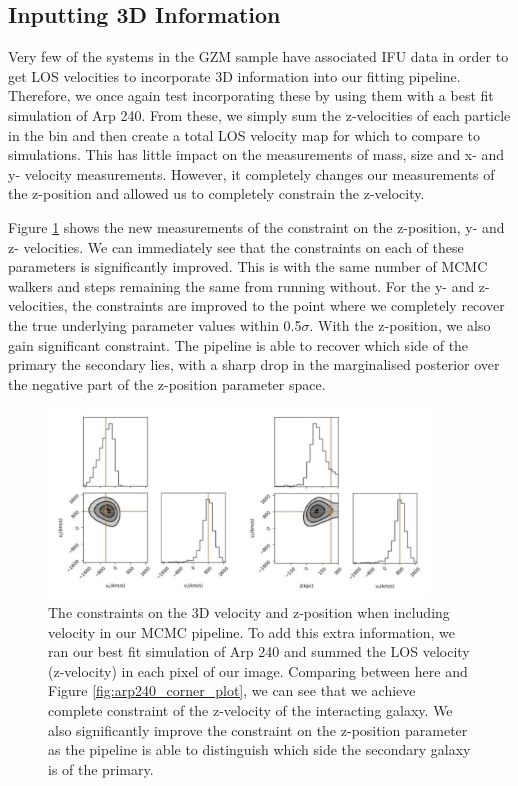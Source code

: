 \subsection{Inputting 3D Information}
Very few of the systems in the GZM sample have associated IFU data in order to get LOS velocities to incorporate 3D information into our fitting pipeline. Therefore, we once again test incorporating these by using them with a best fit simulation of Arp 240. From these, we simply sum the z-velocities of each particle in the bin and then create a total LOS velocity map for which to compare to simulations. This has little impact on the measurements of mass, size and x- and y- velocity measurements. However, it completely changes our measurements of the z-position and allowed us to completely constrain the z-velocity. 

Figure \ref{fig:velocity_corner_plot} shows the new measurements of the constraint on the z-position, y- and z- velocities. We can immediately see that the constraints on each of these parameters is significantly improved. This is with the same number of MCMC walkers and steps remaining the same from running without. For the y- and z- velocities, the constraints are improved to the point where we completely recover the true underlying parameter values within 0.5$\sigma$. With the z-position, we also gain significant constraint. The pipeline is able to recover which side of the primary the secondary lies, with a sharp drop in the marginalised posterior over the negative part of the z-position parameter space.

\begin{figure}
    \centering
    \includegraphics[width=0.9\textwidth]{Chapter1/figures/vel-red-corner.pdf}
    \caption{The constraints on the 3D velocity and z-position when including velocity in our MCMC pipeline. To add this extra information, we ran our best fit simulation of Arp 240 and summed the LOS velocity (z-velocity) in each pixel of our image. Comparing between here and Figure \ref{fig:arp240_corner_plot}, we can see that we achieve complete constraint of the z-velocity of the interacting galaxy. We also significantly improve the constraint on the z-position parameter as the pipeline is able to distinguish which side the secondary galaxy is of the primary.}
    \label{fig:velocity_corner_plot}
\end{figure}

